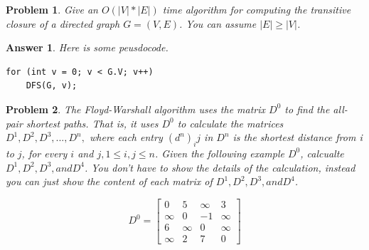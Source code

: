 \documentclass[11pt]{article}
\newtheorem{problem}{Problem}
\newtheorem{answer}{Answer}
\begin{document}
\bigskip

\begin{problem}
 \label{prob:3}
 Give an $O(|V|*|E|)$ time algorithm for computing the transitive closure of a directed graph $G = (V,E)$. You can assume $|E| \geq |V|$.
\end{problem}

\begin{answer}
 \label{ans:3}
 Here is some peusdocode.
\begin{lstlisting}
for (int v = 0; v < G.V; v++)
	DFS(G, v);
\end{lstlisting}
\end{answer}

\bigskip

\begin{problem}
 \label{prob:4}
 The Floyd-Warshall algorithm uses the matrix $D^0$ to find the all-pair shortest
 paths. That is, it uses $D^0$ to calculate the matrices $D^1,D^2,D^3, . . .,D^n,$ where each entry $(d^n)_ij$ in $D^n$ is the shortest distance from i to $j$, for every $i$ and $j, 1 \leq i, j \leq n$. Given the following example $D^0$, calcualte $D^1, D^2, D^3, and D^4$. You don’t have to show the details of the calculation, instead you can just show the content of each matrix of $D^1, D^2, D^3, and D^4$.
 
\begin{center}
\[
D^0=
\begin{bmatrix}
0 & 5 & \infty & 3 \\
\infty & 0 & -1 & \infty \\
6 & \infty & 0 & \infty \\
\infty & 2 & 7 & 0
\end{bmatrix}
\]
\end{center}
\end{problem}
\end{document}
